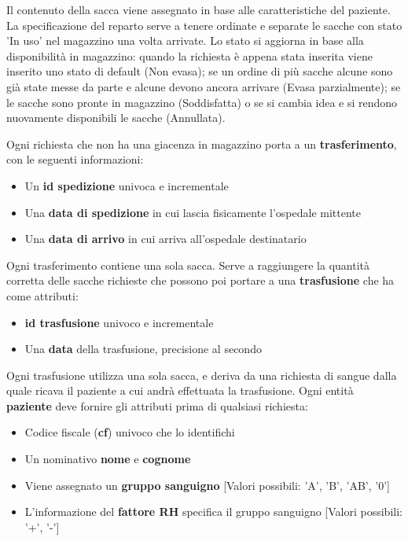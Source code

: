 \documentclass[10pt, a4paper]{article}
\begin{document}
Il contenuto della sacca viene assegnato in base alle caratteristiche del paziente. La specificazione del reparto serve a tenere ordinate e separate le sacche con stato 'In uso' nel magazzino una volta arrivate. Lo stato si aggiorna in base alla disponibilità in magazzino: quando la richiesta è appena stata inserita viene inserito uno stato di default (Non evasa); se un ordine di più sacche alcune sono già state messe da parte e alcune devono ancora arrivare (Evasa parzialmente); se le sacche sono pronte in magazzino (Soddisfatta) o se si cambia idea e si rendono nuovamente disponibili le sacche (Annullata). 

Ogni richiesta che non ha una giacenza in magazzino porta a un \textbf{trasferimento}, con le seguenti informazioni:

\begin{itemize}
    \item Un \textbf{id spedizione} univoca e incrementale
    \item Una \textbf{data di spedizione} in cui lascia fisicamente l'ospedale mittente
    \item Una \textbf{data di arrivo} in cui arriva all'ospedale destinatario
\end{itemize}

Ogni trasferimento contiene una sola sacca. Serve a raggiungere la quantità corretta delle sacche richieste che possono poi portare a una \textbf{trasfusione} che ha come attributi:

\begin{itemize}
    \item \textbf{id trasfusione} univoco e incrementale
    \item Una \textbf{data} della trasfusione, precisione al secondo
\end{itemize}

Ogni trasfusione utilizza una sola sacca, e deriva da una richiesta di sangue dalla quale ricava il paziente a cui andrà effettuata la trasfusione. Ogni entità \textbf{paziente} deve fornire gli attributi prima di qualsiasi richiesta:

\begin{itemize}
    \item Codice fiscale (\textbf{cf}) univoco che lo identifichi
    \item Un nominativo \textbf{nome} e \textbf{cognome}
    \item Viene assegnato un \textbf{gruppo sanguigno} [Valori possibili: 'A', 'B', 'AB', '0']
    \item L'informazione del \textbf{fattore RH} specifica il gruppo sanguigno [Valori possibili: '+', '-']
\end{itemize}
\end{document}
